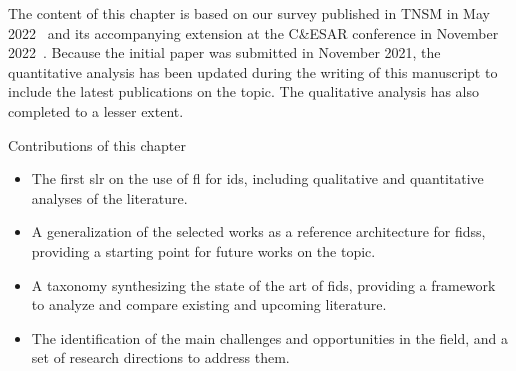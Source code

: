 The content of this chapter is based on our survey published in TNSM in May 2022~\cite{lavaur_EvolutionFederatedLearningbased_2022} and its accompanying extension at the C\&ESAR conference in November 2022~\cite{lavaur_Federatedlearningenabler_2022}.
Because the initial paper was submitted in November 2021, the quantitative analysis has been updated during the writing of this manuscript to include the latest publications on the topic.
The qualitative analysis has also completed to a lesser extent.

\begin{highlightbox}{Contributions of this chapter}
  \begin{itemize}[\textbullet, leftmargin=*, labelsep=10pt]
    \item The first \gls{slr} on the use of \gls{fl} for \gls{ids}, including qualitative and quantitative analyses of the literature.
    \item A generalization of the selected works as a reference architecture for \glspl{fids}, providing a starting point for future works on the topic.
    \item A taxonomy synthesizing the state of the art of \gls{fids}, providing a framework to analyze and compare existing and upcoming literature.
    \item The identification of the main challenges and opportunities in the field, and a set of research directions to address them.
  \end{itemize}
\end{highlightbox}

